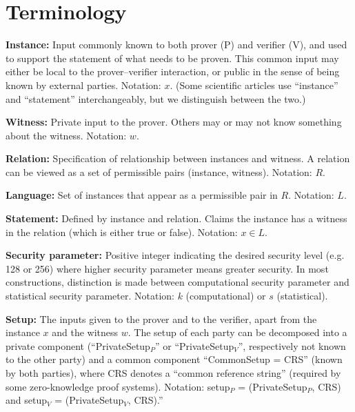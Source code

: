 \section{Terminology}
\label{security:terminology}


{\bfseries \hypertarget{def:instance}{Instance}:} 
	Input commonly known to both prover (P) and verifier (V), and used to support the statement of what needs to be proven.
	This common input may either be local to the prover--verifier interaction,
or public in the sense of being known by external parties. Notation: $x$.
	(Some scientific articles use ``instance'' and ``statement'' interchangeably, but we 
distinguish between the two.)
\loosen
 
{\bfseries  \hypertarget{def:witness}{Witness}:} 
Private input to the prover. Others may or may not know something about the witness. 
Notation: $w$.
 
{\bfseries \hypertarget{def:relation}{Relation}:} 
	Specification of relationship between instances and witness.
	A relation can be viewed as a set of permissible pairs (instance, witness). 
Notation: $R$.
 
{\bfseries \hypertarget{def:language}{Language}:} 
Set of instances that appear as a permissible pair in $R$. 
Notation: $L$.
 
{\bfseries \hypertarget{def:statement}{Statement}:} 
Defined by instance and relation. Claims the instance has a witness in the relation (which is either true or false). 
Notation: $x \in L$.

{\bfseries Security parameter:} 
Positive integer indicating the desired security level (e.g. 128 or 256) where higher security parameter means greater security.
In most constructions, distinction is made between computational security parameter and statistical security parameter. 
Notation: $k$ (computational) or $s$ (statistical).
 


{\bfseries Setup:} The inputs given to the prover and to the verifier, apart from the instance $x$ and the witness $w$. 
	The setup of each party can be decomposed into a private component (``PrivateSetup$_P$'' or ``PrivateSetup$_V$'', respectively not known to the other party) 
	and a common component ``CommonSetup = CRS'' (known by both parties), where CRS denotes a ``common reference string'' (required by some zero-knowledge proof systems). 
	Notation: setup$_P$ = (PrivateSetup$_P$, CRS) and setup$_V$ = (PrivateSetup$_V$, CRS).''
	\loosen

